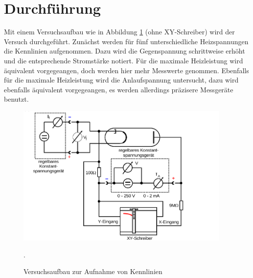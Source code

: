 \section{Durchführung}
\label{sec:Durchführung}

Mit einem Versuchsaufbau wie in Abbildung \ref{fig:aufbau2}
(ohne XY-Schreiber) wird der Versuch durchgeführt. Zunächst
werden für fünf unterschiedliche Heizspannungen die Kennlinien
aufgenommen. Dazu wird die Gegenspannung schrittweise erhöht
und die entsprechende Stromstärke notiert. Für die maximale
Heizleistung wird äquivalent vorgegeangen, doch werden hier mehr
Messwerte genommen. Ebenfalls für die maximale Heizleistung wird
die Anlaufspannung untersucht, dazu wird ebenfalls äquivalent vorgegeangen,
es werden allerdings präzisere Messgeräte benutzt.
\begin{figure}
  \centering
  \includegraphics[height=7cm]{aufbau2.png}
  \caption{Versuchsaufbau zur Aufnahme von Kennlinien}
  \label{fig:aufbau2}
  \cite{skript}.
\end{figure}
